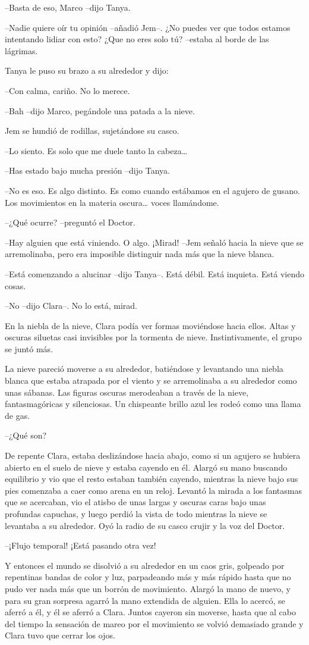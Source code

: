 {--Basta de eso, Marco --dijo Tanya.}

{--Nadie quiere oír tu opinión --añadió Jem--. ¿No puedes ver que todos
 estamos intentando lidiar con esto? ¿Que no eres solo tú? --estaba al
borde de las lágrimas.}

{Tanya le puso su brazo a su alrededor y dijo:}

{--Con calma, cariño. No lo merece.}

{--Bah --dijo Marco, pegándole una patada a la nieve.}

{Jem se hundió de rodillas, sujetándose su casco.}

{--Lo siento. Es solo que me duele tanto la cabeza\ldots{}}

{--Has estado bajo mucha presión --dijo Tanya.}

{--No es eso. Es algo distinto. Es como cuando estábamos en el agujero de
 gusano. Los movimientos en la materia oscura\ldots{} voces llamándome.}

{--¿Qué ocurre? --preguntó el Doctor.}

{--Hay alguien que está viniendo. O algo. ¡Mirad! --Jem señaló hacia la
 nieve que se arremolinaba, pero era imposible distinguir nada más que la
nieve blanca.}

{--Está comenzando a alucinar --dijo Tanya--. Está débil. Está inquieta.
Está viendo cosas.}

{--No --dijo Clara--. No lo está, mirad.}

{En la niebla de la nieve, Clara podía ver formas moviéndose hacia ellos.
 Altas y oscuras siluetas casi invisibles por la tormenta de nieve.
Instintivamente, el grupo se juntó más.}

{La nieve pareció moverse a su alrededor, batiéndose y levantando una
 niebla blanca que estaba atrapada por el viento y se arremolinaba a su
 alrededor como unas sábanas. Las figuras oscuras merodeaban a través de
 la nieve, fantasmagóricas y silenciosas. Un chispeante brillo azul les
rodeó como una llama de gas.}

{--¿Qué son?}

{De repente Clara, estaba deslizándose hacia abajo, como si un agujero se
 hubiera abierto en el suelo de nieve y estaba cayendo en él. Alargó su
 mano buscando equilibrio y vio que el resto estaban también cayendo,
 mientras la nieve bajo sus pies comenzaba a caer como arena en un reloj.
 Levantó la mirada a los fantasmas que se acercaban, vio el atisbo de
 unas largas y oscuras caras bajo unas profundas capuchas, y luego perdió
 la vista de todo mientras la nieve se levantaba a su alrededor. Oyó la
radio de su casco crujir y la voz del Doctor.}

{--¡Flujo temporal! ¡Está pasando otra vez!}

{Y entonces el mundo se disolvió a su alrededor en un caos gris, golpeado
 por repentinas bandas de color y luz, parpadeando más y más rápido hasta
 que no pudo ver nada más que un borrón de movimiento. Alargó la mano de
 nuevo, y para su gran sorpresa agarró la mano extendida de alguien. Ella
 lo acercó, se aferró a él, y él se aferró a Clara. Juntos cayeron sin
 moverse, hasta que al cabo del tiempo la sensación de mareo por el
 movimiento se volvió demasiado grande y Clara tuvo que cerrar los
ojos.}

